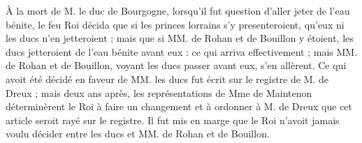 \documentclass[12pt]{article}
\begin{document}
À la mort de M. le duc de Bourgogne,
lorsqu'il fut question d'aller jeter de l'eau bénite, le feu Roi décida que si les princes lorrains s'y presenteroient, qu'eux
ni les ducs n'en jetteroient ; mais que si MM. de Rohan et de
Bouillon y étoient, les ducs jetteroient de l'eau bénite
avant eux : ce qui arriva effectivement ; mais MM. de Rohan et
de Bouillon, voyant les ducs passer avant eux, s'en allèrent.
Ce qui avoit été décidé en faveur de MM. les ducs fut écrit sur le registre
de M. de Dreux ; mais deux ans après, les représentations de Mme
de Maintenon déterminèrent le Roi
à faire un changement et à ordonner à M. de Dreux que cet
article seroit rayé sur le registre. Il fut mis en marge que le
Roi n'avoit jamais voulu décider entre les ducs et
MM. de Rohan et de Bouillon.

\printindex
\end{document}
